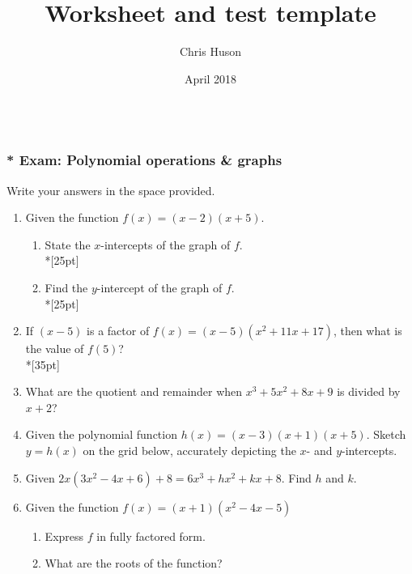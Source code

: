 \documentclass[12pt, oneside]{article}
\title{Worksheet and test template}
\author{Chris Huson}
\date{April 2018}
\begin{document}
\subsubsection*{\\* Exam: Polynomial operations \& graphs}
Write your answers in the space provided.

\begin{enumerate}

\item Given the function $f(x)=(x-2)(x+5)$. 
\begin{enumerate}
    \item State the $x$-intercepts of the graph of $f$. \\*[25pt]
    \item Find the $y$-intercept of the graph of $f$.\\*[25pt]
\end{enumerate}


\item If $(x-5)$ is a factor of $f(x)=(x-5)(x^2+11x+17)$, then what is the value of $f(5)$?\\*[35pt]

\item What are the quotient and remainder when $x^3+5x^2+8x+9$ is divided by $x+2$?

\newpage

\item Given the polynomial function $h(x)=(x-3)(x+1)(x+5)$. Sketch $y = h(x)$ on the grid below, accurately depicting the $x$- and $y$-intercepts.
\begin{center}
\end{center}

\item Given $2x(3x^2-4x+6)+8=6x^3+hx^2+kx+8$. Find $h$ and $k$.\\[80pt]

\item Given the function $f(x)=(x+1)(x^2-4x-5)$
\begin{enumerate}
    \item Express $f$ in fully factored form.\\[40pt]
    \item What are the roots of the function?\\[30pt]
\end{enumerate}



\end{enumerate}
\end{document}
